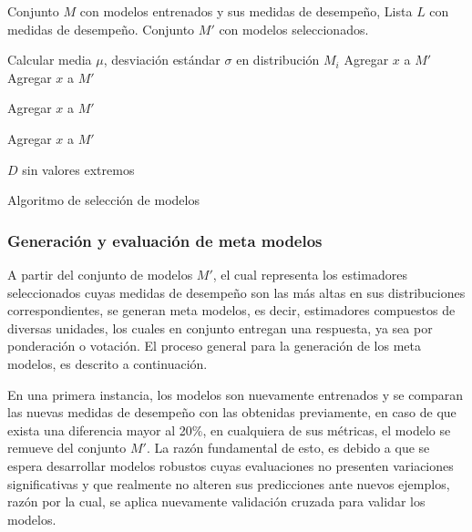 \begin{algorithm}[H]
	\begin{algorithmic}[1]
		\REQUIRE Conjunto $M$ con modelos entrenados y sus medidas de desempeño, Lista $L$ con medidas de desempeño. \label{lin:lineaRara}
		\ENSURE Conjunto $M'$ con modelos seleccionados.
		
		
		\STATE Calcular  media $\mu$, desviación estándar $\sigma$ en distribución $M_{i}$
		\STATE Agregar $x$ a $M'$
		\ENDIF
		\ENDFOR
		\STATE Agregar $x$ a $M'$
		\ENDIF
		\ENDFOR
		
		\STATE Agregar $x$ a $M'$
		\ENDIF
		\ENDFOR
		
		\STATE Agregar $x$ a $M'$
		\ENDIF
		\ENDFOR
		\ENDIF
		\ENDIF
		\ENDIF
		\ENDFOR
		
		\RETURN $D$ sin valores extremos
	\end{algorithmic}
	\caption{Algoritmo de selección de modelos}\label{alg:select}
\end{algorithm}

\subsubsection{Generación y evaluación de meta modelos}

A partir del conjunto de modelos $M'$, el cual representa los estimadores seleccionados cuyas medidas de desempeño son las más altas en sus distribuciones correspondientes, se generan meta modelos, es decir, estimadores compuestos de diversas unidades, los cuales en conjunto entregan una respuesta, ya sea por ponderación o votación. El proceso general para la generación de los meta modelos, es descrito a continuación.

En una primera instancia, los modelos son nuevamente entrenados y se comparan las nuevas medidas de desempeño con las obtenidas previamente, en caso de que exista una diferencia mayor al 20\%, en cualquiera de sus métricas, el modelo se remueve del conjunto $M'$. La razón fundamental de esto, es debido a que se espera desarrollar modelos robustos cuyas evaluaciones no presenten variaciones significativas y que realmente no alteren sus predicciones ante nuevos ejemplos, razón por la cual, se aplica nuevamente validación cruzada para validar los modelos.

